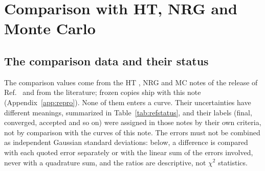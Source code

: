 \documentclass[11pt,a4paper]{article}
\numberwithin{equation}{section}
\begin{document}
\section{Comparison with HT, NRG and Monte Carlo}\label{sec:compare}
\subsection{The comparison data and their status}
The comparison values come from the HT \cite{noteHT}, NRG \cite{noteNRG} and MC
\cite{noteMC} notes of the release of Ref.~\cite{LRIpaper} and from the literature; frozen
copies ship with this note (Appendix~\ref{app:repro}). None of them enters a curve. Their
uncertainties have different meanings, summarized in Table~\ref{tab:refstatus}, and their
labels (final, converged, accepted and so on) were assigned in those notes by their own
criteria, not by comparison with the curves of this note. The errors must not be combined as
independent Gaussian standard deviations: below, a difference is compared with each quoted
error separately or with the linear sum of the errors involved, never with a quadrature sum,
and the ratios are descriptive, not $\chi^2$ statistics.
\end{document}
